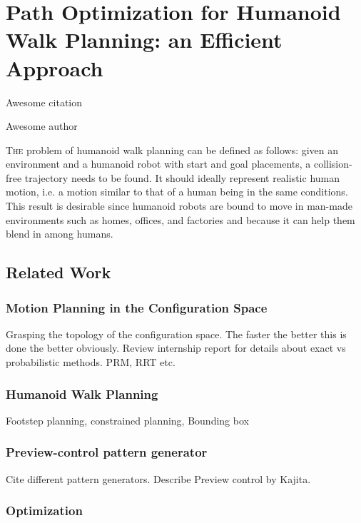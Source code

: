\chapter{Path Optimization for Humanoid Walk Planning: an Efficient Approach}\label{chap:path-optim}

\epigraph{Awesome citation}{Awesome author}
\clearpage

\lettrine[lines=3, lraise=0., nindent=0em, slope=-.5em]%
{T}{he} problem of humanoid walk planning can be defined as follows:
given an environment and a humanoid robot with start and goal
placements, a collision-free trajectory needs to be found. It should
ideally represent realistic human motion, i.e. a motion similar to
that of a human being in the same conditions. This result is desirable
since humanoid robots are bound to move in man-made environments such
as homes, offices, and factories and because it can help them blend in
among humans.

\section{Related Work}
\label{sec:related-work}

\subsection{Motion Planning in the Configuration Space}

Grasping the topology of the configuration space. The faster the
better this is done the better obviously. Review internship report for
details about exact vs probabilistic methods.
PRM, RRT etc.

\subsection{Humanoid Walk Planning}

Footstep planning, constrained planning, Bounding box

\subsection{Preview-control pattern generator}

Cite different pattern generators.
Describe Preview control by Kajita.

\subsection{Optimization}

